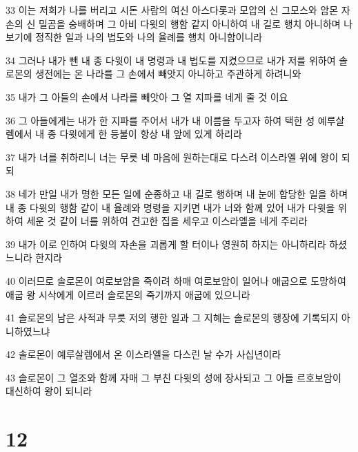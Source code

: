 \par 33 이는 저희가 나를 버리고 시돈 사람의 여신 아스다롯과 모압의 신 그모스와 암몬 자손의 신 밀곰을 숭배하며 그 아비 다윗의 행함 같지 아니하여 내 길로 행치 아니하며 나 보기에 정직한 일과 나의 법도와 나의 율례를 행치 아니함이니라
\par 34 그러나 내가 뺀 내 종 다윗이 내 명령과 내 법도를 지켰으므로 내가 저를 위하여 솔로몬의 생전에는 온 나라를 그 손에서 빼앗지 아니하고 주관하게 하려니와
\par 35 내가 그 아들의 손에서 나라를 빼앗아 그 열 지파를 네게 줄 것 이요
\par 36 그 아들에게는 내가 한 지파를 주어서 내가 내 이름을 두고자 하여 택한 성 예루살렘에서 내 종 다윗에게 한 등불이 항상 내 앞에 있게 하리라
\par 37 내가 너를 취하리니 너는 무릇 네 마음에 원하는대로 다스려 이스라엘 위에 왕이 되되
\par 38 네가 만일 내가 명한 모든 일에 순종하고 내 길로 행하며 내 눈에 합당한 일을 하며 내 종 다윗의 행함 같이 내 율례와 명령을 지키면 내가 너와 함께 있어 내가 다윗을 위하여 세운 것 같이 너를 위하여 견고한 집을 세우고 이스라엘을 네게 주리라
\par 39 내가 이로 인하여 다윗의 자손을 괴롭게 할 터이나 영원히 하지는 아니하리라 하셨느니라 한지라
\par 40 이러므로 솔로몬이 여로보암을 죽이려 하매 여로보암이 일어나 애굽으로 도망하여 애굽 왕 시삭에게 이르러 솔로몬의 죽기까지 애굽에 있으니라
\par 41 솔로몬의 남은 사적과 무릇 저의 행한 일과 그 지혜는 솔로몬의 행장에 기록되지 아니하였느냐
\par 42 솔로몬이 예루살렘에서 온 이스라엘을 다스린 날 수가 사십년이라
\par 43 솔로몬이 그 열조와 함께 자매 그 부친 다윗의 성에 장사되고 그 아들 르호보암이 대신하여 왕이 되니라

\chapter{12}

